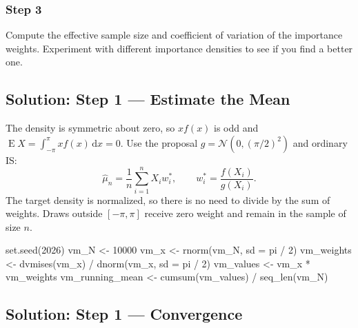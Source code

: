 \documentclass[
  letterpaper,
  DIV=11,
  numbers=noendperiod]{scrartcl}
\newenvironment{Shaded}{\begin{snugshade}}{\end{snugshade}}
\newcommand{\AttributeTok}[1]{\textcolor[rgb]{0.40,0.45,0.13}{#1}}
\newcommand{\DecValTok}[1]{\textcolor[rgb]{0.68,0.00,0.00}{#1}}
\newcommand{\FunctionTok}[1]{\textcolor[rgb]{0.28,0.35,0.67}{#1}}
\newcommand{\NormalTok}[1]{\textcolor[rgb]{0.00,0.23,0.31}{#1}}
\newcommand{\OtherTok}[1]{\textcolor[rgb]{0.00,0.23,0.31}{#1}}
\newcommand{\SpecialCharTok}[1]{\textcolor[rgb]{0.37,0.37,0.37}{#1}}
\begin{document}
\subsubsection{Step 3}\label{step-3}

Compute the effective sample size and coefficient of variation of the
importance weights. Experiment with different importance densities to
see if you find a better one.


\subsection{Solution: Step 1 --- Estimate the
Mean}\label{solution-step-1-estimate-the-mean}

The density is symmetric about zero, so \(x f(x)\) is odd and
\(\operatorname{E}X = \int_{-\pi}^{\pi} x f(x)\,\mathrm{d}x = 0\). Use
the proposal \(g = \mathcal{N}(0,(\pi/2)^2)\) and ordinary IS: \[
  \hat\mu_n = \frac{1}{n}\sum_{i=1}^n X_i w_i^*,
  \qquad w_i^* = \frac{f(X_i)}{g(X_i)}.
\] The target density is normalized, so there is no need to divide by
the sum of weights. Draws outside \([-\pi,\pi]\) receive zero weight and
remain in the sample of size \(n\).

\begin{Shaded}
\begin{Highlighting}[]
\FunctionTok{set.seed}\NormalTok{(}\DecValTok{2026}\NormalTok{)}
\NormalTok{vm\_N }\OtherTok{\textless{}{-}} \DecValTok{10000}
\NormalTok{vm\_x }\OtherTok{\textless{}{-}} \FunctionTok{rnorm}\NormalTok{(vm\_N, }\AttributeTok{sd =}\NormalTok{ pi }\SpecialCharTok{/} \DecValTok{2}\NormalTok{)}
\NormalTok{vm\_weights }\OtherTok{\textless{}{-}} \FunctionTok{dvmises}\NormalTok{(vm\_x) }\SpecialCharTok{/} \FunctionTok{dnorm}\NormalTok{(vm\_x, }\AttributeTok{sd =}\NormalTok{ pi }\SpecialCharTok{/} \DecValTok{2}\NormalTok{)}
\NormalTok{vm\_values }\OtherTok{\textless{}{-}}\NormalTok{ vm\_x }\SpecialCharTok{*}\NormalTok{ vm\_weights}
\NormalTok{vm\_running\_mean }\OtherTok{\textless{}{-}} \FunctionTok{cumsum}\NormalTok{(vm\_values) }\SpecialCharTok{/} \FunctionTok{seq\_len}\NormalTok{(vm\_N)}
\end{Highlighting}
\end{Shaded}

\subsection{Solution: Step 1 ---
Convergence}\label{solution-step-1-convergence}
\end{document}
